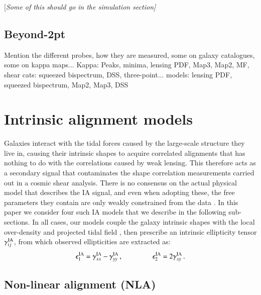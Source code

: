 \documentclass[useAMS,usenatbib]{mn2e}
\begin{document}
 {[\it Some of this should go in the simulation section]}
 
\subsection{Beyond-2pt}
\label{subsec:beyond-2pt}

 Mention the different probes, how they are measured, some on galaxy catalogues, some on kappa maps...
 Kappa: Peaks, minima, lensing PDF,  Map3, Map2, MF,
 shear cats: squeezed bispectrum, DSS, three-point...
 models: lensing PDF, squeezed bispectrum, Map2, Map3, DSS
 \section{Intrinsic alignment models}
 \label{sec:IA_th}
 
Galaxies interact with the tidal forces caused by the large-scale structure  they live in, causing their intrinsic shapes to acquire correlated alignments that has nothing to do with the correlations caused by weak lensing. This therefore acts as a secondary signal that contaminates the shape correlation measurements carried out in a cosmic shear analysis. There is no consensus on the actual physical model that describes the IA signal, and even when adopting these, the free parameters they contain are only weakly constrained from the data \citep[see][for a review]{IA_review}.  %
In this paper we consider four such IA models that we describe in the following sub-sections. In all cases, our models couple the galaxy intrinsic shapes with the local over-density and projected tidal field , then prescribe an intrinsic ellipticity tensor $\gamma_{ij}^{\rm IA}$, from which observed ellipticities are extracted as:
 \begin{eqnarray}
\epsilon_{1}^{\rm IA} = \gamma_{xx}^{\rm IA} - \gamma_{yy}^{\rm IA} \, , \hspace{1.5cm}\epsilon_{2}^{\rm IA} = 2 \gamma_{xy}^{\rm IA}\, .
\label{eq:tidal_th_deltaNLA}
\end{eqnarray}


 
\subsection{Non-linear alignment (NLA)}
\end{document}
